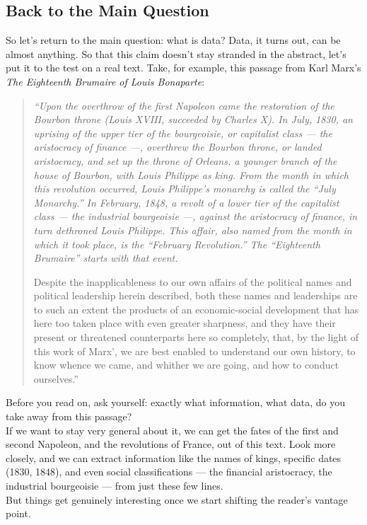 \subsection{Back to the Main Question}
\label{sub:return-to-main-question}

So let's return to the main question: what is data? Data, it turns out, can be almost anything. So that this claim doesn't stay stranded in the abstract, let's put it to the test on a real text. Take, for example, this passage from Karl Marx's \textit{The Eighteenth Brumaire of Louis Bonaparte}\autocite{marx1852}:

\begin{quote}
\itshape
``Upon the overthrow of the first Napoleon came the restoration of the Bourbon throne (Louis XVIII, succeeded by Charles X). In July, 1830, an uprising of the upper tier of the bourgeoisie, or capitalist class --- the aristocracy of finance ---, overthrew the Bourbon throne, or landed aristocracy, and set up the throne of Orleans, a younger branch of the house of Bourbon, with Louis Philippe as king. From the month in which this revolution occurred, Louis Philippe's monarchy is called the ``July Monarchy.'' In February, 1848, a revolt of a lower tier of the capitalist class --- the industrial bourgeoisie ---, against the aristocracy of finance, in turn dethroned Louis Philippe. This affair, also named from the month in which it took place, is the ``February Revolution.'' The ``Eighteenth Brumaire'' starts with that event.

Despite the inapplicableness to our own affairs of the political names and political leadership herein described, both these names and leaderships are to such an extent the products of an economic-social development that has here too taken place with even greater sharpness, and they have their present or threatened counterparts here so completely, that, by the light of this work of Marx', we are best enabled to understand our own history, to know whence we came, and whither we are going, and how to conduct ourselves.''
\end{quote}
Before you read on, ask yourself: exactly what information, what data, do you take away from this passage?\\
If we want to stay very general about it, we can get the fates of the first and second Napoleon, and the revolutions of France, out of this text. Look more closely, and we can extract information like the names of kings, specific dates (1830, 1848), and even social classifications --- the financial aristocracy, the industrial bourgeoisie --- from just these few lines.\\
But things get genuinely interesting once we start shifting the reader's vantage point.

